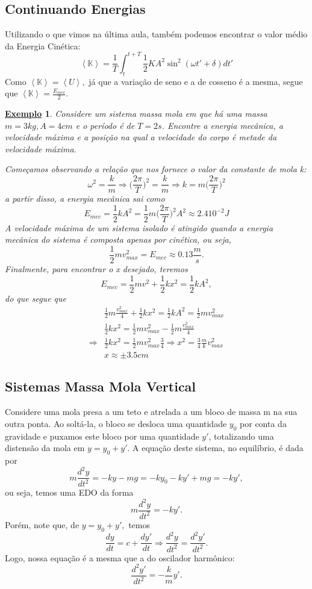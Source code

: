 \documentclass{article}
\newtheorem{example}{\underline{Exemplo}}
\begin{document}
\subsection{Continuando Energias}
  Utilizando o que vimos na última aula, também podemos encontrar o valor médio da Energia Cinética: 
    \[
      \left< \mathbb{K} \right> = \frac{1}{T}\int_{t}^{t+T}\frac{1}{2}KA^{2}\sin^{2}{(\omega t'+\delta )}dt'
    \] 
Como \(\left< \mathbb{K} \right> = \left< U \right>,\) já que a variação de seno e a de cosseno é a mesma, segue que \(\left< \mathbb{K} \right> = \frac{E_{mec}}{2}\).
\begin{example}
  Considere um sistema massa mola em que há uma massa \(m=3kg, A = 4cm\) e o período é de \(T=2s\). Encontre a energia mecânica, a velocidade máxima e a posição na qual
a velocidade do corpo é metade da velocidade máxima.

  Começamos observando a relação que nos fornece o valor da constante de mola k: 
  \[
    \omega ^{2} = \frac{k}{m} \Rightarrow \biggl(\frac{2\pi }{T}\biggr)^{2} = \frac{k}{m} \Rightarrow k = m \biggl(\frac{2\pi }{T}\biggr)^{2}
  \]
a partir disso, a energia mecânica sai como 
  \[
    E_{mec} = \frac{1}{2}kA^{2} = \frac{1}{2}m \biggl(\frac{2\pi }{T}\biggr)^{2}A^{2}\approx 2.4 10^{-2}J
  \]
A velocidade máxima de um sistema isolado é atingido quando a energia mecânica do sistema é composta apenas por cinética, ou seja, 
  \[
    \frac{1}{2}mv_{max}^{2} = E_{mec}\approx 0.13\frac{m}{s}.
  \]
  Finalmente, para encontrar o x desejado, teremos 
  \[
    E_{mec} = \frac{1}{2}mv^{2} + \frac{1}{2}kx^{2} = \frac{1}{2}kA^{2},
  \]
  do que segue que 
 \begin{align*}
   &\frac{1}{2}m \frac{v_{max}^{2}}{4} + \frac{1}{2}kx^{2} = \frac{1}{2} kA^{2} = \frac{1}{2}mv_{max}^{2}\\
   &\frac{1}{2}kx^{2}=\frac{1}{2}mv_{max}^{2}-\frac{1}{2}m \frac{v_{max}^{2}}{4}\\
   \Rightarrow &\frac{1}{2}kx^{2} = \frac{1}{2}mv_{max}^{2}\frac{3}{4} \Rightarrow x^{2} = \frac{3}{4}\frac{m}{k}v_{max}^{2}\\
               & x\approx\pm 3.5cm 
 \end{align*}
\end{example}
\subsection{Sistemas Massa Mola Vertical}

  Considere uma mola presa a um teto e atrelada a um bloco de massa m na sua outra ponta. Ao soltá-la, o bloco
se desloca uma quantidade \(y_{0}\) por conta da gravidade e puxamos este bloco por uma quantidade \(y'\), totalizando
uma distensão da mola em \(y = y_{0}+y'.\) A equação deste sistema, no equilíbrio, é dada por 
  \[
    m \frac{d^{2}y}{dt^{2}} = -ky - mg = -ky_{0}-ky'+mg = - ky',
  \]
ou seja, temos uma EDO da forma 
  \[
    m \frac{d^{2}y}{dt^{2}} = -ky'.
  \]
Porém, note que, de \(y=y_{0} + y',\) temos 
  \[
    \frac{dy}{dt} = c + \frac{dy'}{dt} \Rightarrow \frac{d^{2}y}{dt^{2}} = \frac{d^{2}y'}{dt^{2}}.
  \]
Logo, nossa equação é a mesma que a do oscilador harmônico:
  \[
    \frac{d^{2}y'}{dt^{2}} = -\frac{k}{m}y'.
  \]
\end{document}
